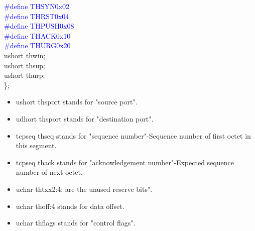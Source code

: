 \documentclass{uathesis}
\begin{document}
\begin{appendices}
\noindent\textcolor{blue}{{\#}define TH\textunderscore SYN\hspace{3.6mm}0x02}\\
\noindent\textcolor{blue}{{\#}define TH\textunderscore RST\hspace{4.62mm}0x04}\\
\noindent\textcolor{blue}{{\#}define TH\textunderscore PUSH\hspace{1.8mm}0x08}\\
\noindent\textcolor{blue}{{\#}define TH\textunderscore ACK\hspace{3.9mm}0x10}\\
\noindent\textcolor{blue}{{\#}define TH\textunderscore URG\hspace{3.9mm}0x20}\\
 u\textunderscore short\hspace{5mm} th\textunderscore win;\\
 u\textunderscore short\hspace{5mm} th\textunderscore sup;\\
 u\textunderscore short\hspace{5mm} th\textunderscore urp;\\
\big\};\\

\begin{itemize}
\item u\textunderscore short th\textunderscore sport stands for "source port".

\item u\textunderscore dhort th\textunderscore sport stands for "destination port".

\item tcp\textunderscore seq th\textunderscore seq stands for "sequence number"-Sequence number of first octet in this segment.

\item tcp\textunderscore seq th\textunderscore ack stands for "acknowledgement number"-Expected sequence number of next octet.

\item u\textunderscore char th\textunderscore tx\textunderscore x2:4; are the unused reserve bits".

\item u\textunderscore char th\textunderscore off:4 stands for data offset.

\item u\textunderscore char th\textunderscore flags stands for "control flags".


\end{itemize}
\end{appendices}
\end{document}
